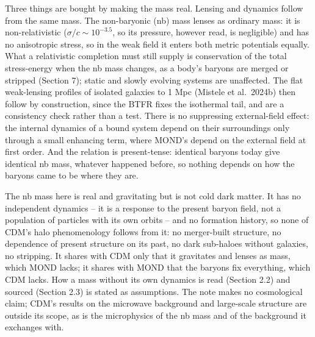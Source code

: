 \documentclass[
  10pt,
]{article}
\begin{document}
Three things are bought by making the mass real. Lensing and dynamics follow from the same mass. The non-baryonic (nb) mass lenses as ordinary mass: it is non-relativistic ($\sigma/c\sim10^{-3.5}$, so its pressure, however read, is negligible) and has no anisotropic stress, so in the weak field it enters both metric potentials equally. What a relativistic completion must still supply is conservation of the total stress-energy when the nb mass changes, as a body's baryons are merged or stripped (Section 7); static and slowly evolving systems are unaffected. The flat weak-lensing profiles of isolated galaxies to 1 Mpc (Mistele et al.~2024b) then follow by construction, since the BTFR fixes the isothermal tail, and are a consistency check rather than a test. There is no suppressing external-field
effect: the internal dynamics of a bound system depend on their
surroundings only through a small enhancing term, where MOND's depend on
the external field at first order. And the relation is present-tense:
identical baryons today give identical nb mass, whatever happened
before, so nothing depends on how the baryons came to be where they are.

The nb mass here is real and gravitating but is not cold dark matter. It
has no independent dynamics -- it is a response to the present baryon
field, not a population of particles with its own orbits -- and no
formation history, so none of CDM's halo phenomenology follows from it:
no merger-built structure, no dependence of present structure on its
past, no dark sub-haloes without galaxies, no stripping. It shares with
CDM only that it gravitates and lenses as mass, which MOND lacks; it
shares with MOND that the baryons fix everything, which CDM lacks. How a
mass without its own dynamics is read (Section 2.2) and sourced (Section
2.3) is stated as assumptions. The note makes no cosmological claim;
CDM's results on the microwave background and large-scale structure are
outside its scope, as is the microphysics of the nb mass and of the background it exchanges with.
\end{document}
